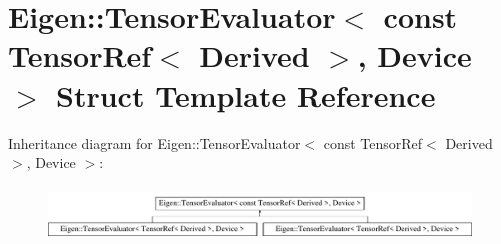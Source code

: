 \hypertarget{struct_eigen_1_1_tensor_evaluator_3_01const_01_tensor_ref_3_01_derived_01_4_00_01_device_01_4}{}\section{Eigen\+:\+:Tensor\+Evaluator$<$ const Tensor\+Ref$<$ Derived $>$, Device $>$ Struct Template Reference}
\label{struct_eigen_1_1_tensor_evaluator_3_01const_01_tensor_ref_3_01_derived_01_4_00_01_device_01_4}
Inheritance diagram for Eigen\+:\+:Tensor\+Evaluator$<$ const Tensor\+Ref$<$ Derived $>$, Device $>$\+:\begin{figure}[H]
\begin{center}
\leavevmode
\includegraphics[height=1.450777cm]{struct_eigen_1_1_tensor_evaluator_3_01const_01_tensor_ref_3_01_derived_01_4_00_01_device_01_4}
\end{center}
\end{figure}
